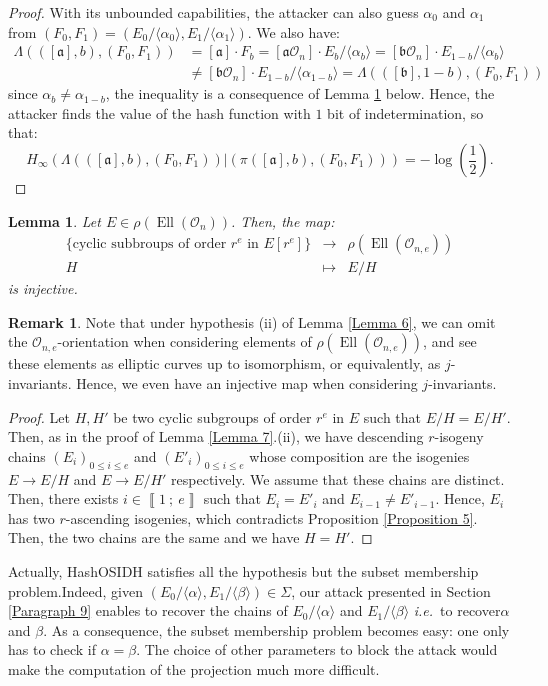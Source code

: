 \documentclass[a4paper,10pt,notitlepage]{report}
\theoremstyle{definition}
\theoremstyle{plain}
\newtheorem{Lemma}[Definition]{Lemma}
\theoremstyle{definition}
\newtheorem{Remark}[Definition]{Remark}
\newcommand{\ie}{\emph{i.e.}\ }
\newcommand{\mO}{\mathcal{O}}
\renewcommand{\i}[2]{\left\llbracket #1~;~#2\right\rrbracket}
\renewcommand{\(}{\left(}
\renewcommand{\)}{\right)}
\newcommand{\mf}[1]{\mathfrak{#1}}
\DeclareMathOperator{\Ell}{Ell}
\begin{document}
\begin{proof}
With its unbounded capabilities, the attacker can also guess $\alpha_0$ and $\alpha_1$ from $(F_0,F_1)=(E_0/\langle\alpha_0\rangle, E_1/\langle\alpha_1\rangle)$.  We also have:
\begin{align*}\Lambda(([\mf{a}],b),(F_0,F_1))&=[\mf{a}]\cdot F_b=[\mf{a}\mO_n]\cdot E_b/\langle\alpha_b\rangle=[\mf{b}\mO_n]\cdot E_{1-b}/\langle\alpha_b\rangle\\
&\neq [\mf{b}\mO_n]\cdot E_{1-b}/\langle\alpha_{1-b}\rangle=\Lambda(([\mf{b}],1-b),(F_0,F_1))
\end{align*}
since $\alpha_b\neq\alpha_{1-b}$, the inequality is a consequence of Lemma \ref{Lemma 23} below. Hence, the attacker finds the value of the hash function with $1$ bit of indetermination, so that:
\[H_\infty(\Lambda(([\mf{a}],b),(F_0,F_1))|(\pi([\mf{a}],b),(F_0,F_1)))=-\log\(\frac{1}{2}\).\]
\end{proof}

\begin{Lemma}\label{Lemma 23}
Let $E\in \rho(\Ell(\mO_n))$. Then, the map:
\[\begin{array}{rcl}
\{\mbox{cyclic subbroups of order } r^e \mbox{ in } E[r^e]\}& \longrightarrow & \rho(\Ell(\mO_{n,e}))\\
H & \longmapsto & E/H
\end{array}\]
is injective.
\end{Lemma}

\begin{Remark}
Note that under hypothesis (ii) of Lemma \ref{Lemma 6},  we can omit the $\mO_{n,e}$-orientation when considering elements of $\rho(\Ell(\mO_{n,e}))$, and see these elements as elliptic curves up to isomorphism, or equivalently, as $j$-invariants.  Hence, we even have an injective map when considering $j$-invariants.
\end{Remark}

\begin{proof}
Let $H, H'$ be two cyclic subgroups of order $r^e$ in $E$ such that $E/H=E/H'$. Then, as in the proof of Lemma \ref{Lemma 7}.(ii), we have descending $r$-isogeny chains $(E_i)_{0\leq i\leq e}$ and $(E'_i)_{0\leq i\leq e}$ whose composition are the isogenies $E\longrightarrow E/H$ and $E\longrightarrow E/H'$ respectively. We assume that these chains are distinct. Then, there exists $i\in\i{1}{e}$ such that $E_i=E'_i$ and $E_{i-1}\neq E'_{i-1}$. Hence, $E_i$ has two $r$-ascending isogenies, which contradicts Proposition \ref{Proposition 5}. Then, the two chains are the same and we have $H=H'$.
\end{proof}

Actually, HashOSIDH satisfies all the hypothesis but the subset membership problem.Indeed, given $(E_0/\langle\alpha\rangle, E_1/\langle\beta\rangle)\in \Sigma$, our attack presented in Section \ref{Paragraph 9} enables to recover the chains of $E_0/\langle\alpha\rangle$ and $E_1/\langle\beta\rangle$ \ie to recover$\alpha$ and $\beta$. As a consequence, the subset membership problem becomes easy: one only has to check if $\alpha=\beta$. The choice of other parameters to block the attack would make the computation of the projection much more difficult.
\end{document}
